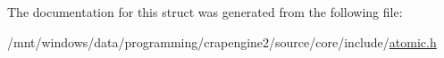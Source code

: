 The documentation for this struct was generated from the following file\+:\begin{DoxyCompactItemize}
\item 
/mnt/windows/data/programming/crapengine2/source/core/include/\hyperlink{atomic_8h}{atomic.\+h}\end{DoxyCompactItemize}
